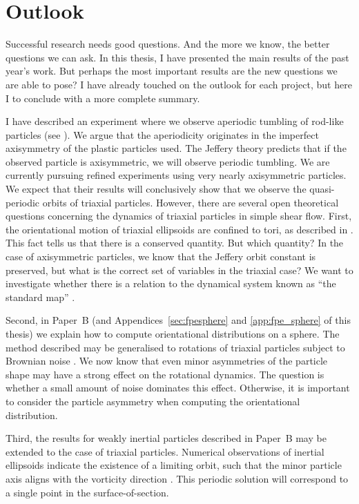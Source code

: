 \documentclass[thesis.tex]{subfiles}
\begin{document}
\chapter{Outlook}
Successful research needs good questions. And the more we know, the better questions we can ask.
In this thesis, I have presented the main results of the past year's work. But perhaps the most important results are the new questions we are able to pose? I have already touched on the outlook for each project, but here I to conclude with a more complete summary.

I have described an experiment where we observe aperiodic tumbling of rod-like particles (see ). We argue that the aperiodicity originates in the imperfect axisymmetry of the plastic particles used. The Jeffery theory predicts that if the observed particle is axisymmetric, we will observe periodic tumbling. We are currently pursuing refined experiments using very nearly axisymmetric particles. We expect that their results will conclusively show that we observe the quasi-periodic orbits of triaxial particles.
However, there are several open theoretical questions concerning the dynamics of triaxial particles in simple shear flow. 
First, the orientational motion of triaxial ellipsoids are confined to tori, as described in . This fact tells us that there is a conserved quantity. But which quantity? In the case of axisymmetric particles, we know that the Jeffery orbit constant is preserved, but what is the correct set of variables in the triaxial case? We want to investigate whether there is a relation to the dynamical system known as ``the standard map'' \cite{ott2002}.

Second, in Paper~B (and Appendices~\ref{sec:fpesphere} and \ref{app:fpe_sphere} of this thesis) we explain how to compute orientational distributions on a sphere. The method described may be generalised to rotations of triaxial particles subject to Brownian noise \cite{favro1960,brenner1972,hubbard1972}. We now know that even minor asymmetries of the particle shape may have a strong effect on the rotational dynamics. The question is whether a small amount of noise dominates this effect. Otherwise, it is important to consider the particle asymmetry when computing the orientational distribution.

Third, the results for weakly inertial particles described in Paper~B may be extended to the case of triaxial particles. Numerical observations of inertial ellipsoids indicate the existence of a limiting orbit, such that the minor particle axis aligns with the vorticity direction \cite{lundell2011}. This periodic solution will correspond to a single point in the surface-of-section.
\end{document}
